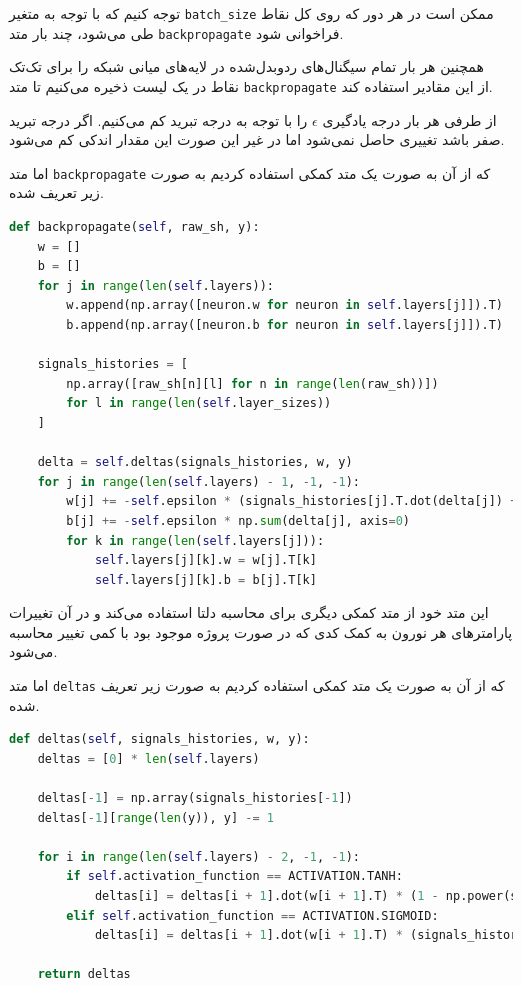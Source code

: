 \documentclass[a4paper, 12pt]{article}
\theoremstyle{definition}
\begin{document}
توجه کنیم که با توجه به متغیر
\texttt{batch\_size}
ممکن است در هر دور که روی کل نقاط طی می‌شود، چند بار متد
\texttt{backpropagate}
فراخوانی شود.

همچنین هر بار تمام سیگنال‌های ردوبدل‌شده در لایه‌های میانی شبکه را برای تک‌تک نقاط در یک لیست ذخیره می‌کنیم تا متد
\texttt{backpropagate}
از این مقادیر استفاده کند.

از طرفی هر بار درجه یادگیری
$\epsilon$
را با توجه به درجه تبرید کم می‌کنیم. اگر درجه تبرید صفر باشد تغییری حاصل نمی‌شود اما در غیر این صورت این مقدار اندکی کم می‌شود.

اما متد
\texttt{backpropagate}
که از آن به صورت یک متد کمکی استفاده کردیم به صورت زیر تعریف شده.

\LTR
\begin{lstlisting}[language=Python]
def backpropagate(self, raw_sh, y):
    w = []
    b = []
    for j in range(len(self.layers)):
        w.append(np.array([neuron.w for neuron in self.layers[j]]).T)
        b.append(np.array([neuron.b for neuron in self.layers[j]]).T)

    signals_histories = [
        np.array([raw_sh[n][l] for n in range(len(raw_sh))])
        for l in range(len(self.layer_sizes))
    ]

    delta = self.deltas(signals_histories, w, y)
    for j in range(len(self.layers) - 1, -1, -1):
        w[j] += -self.epsilon * (signals_histories[j].T.dot(delta[j]) + self.r_lambda * w[j])
        b[j] += -self.epsilon * np.sum(delta[j], axis=0)
        for k in range(len(self.layers[j])):
            self.layers[j][k].w = w[j].T[k]
            self.layers[j][k].b = b[j].T[k]
\end{lstlisting}
\RTL

این متد خود از متد کمکی دیگری برای محاسبه دلتا استفاده می‌کند و در آن تغییرات پارامترهای هر نورون به کمک کدی که در صورت پروژه موجود بود با کمی تغییر محاسبه می‌شود.

اما متد
\texttt{deltas}
که از آن به صورت یک متد کمکی استفاده کردیم به صورت زیر تعریف شده.

\LTR
\begin{lstlisting}[language=Python]
def deltas(self, signals_histories, w, y):
    deltas = [0] * len(self.layers)

    deltas[-1] = np.array(signals_histories[-1])
    deltas[-1][range(len(y)), y] -= 1

    for i in range(len(self.layers) - 2, -1, -1):
        if self.activation_function == ACTIVATION.TANH:
            deltas[i] = deltas[i + 1].dot(w[i + 1].T) * (1 - np.power(signals_histories[i + 1], 2))
        elif self.activation_function == ACTIVATION.SIGMOID:
            deltas[i] = deltas[i + 1].dot(w[i + 1].T) * (signals_histories[i + 1] * (1 - signals_histories[i + 1]))

    return deltas
\end{lstlisting}
\RTL
\end{document}
